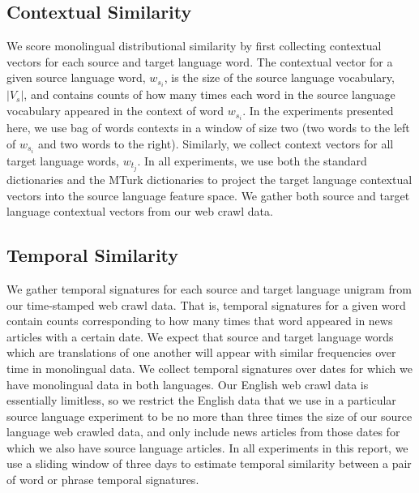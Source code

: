 \documentclass[11pt]{article}
\begin{document}
\subsection{Contextual Similarity} 
We score monolingual distributional similarity by first collecting contextual vectors for each source and target language word. The contextual vector for a given source language word, $w_{s_i}$, is the size of the source language vocabulary, $|V_s|$, and contains counts of how many times each word in the source language vocabulary appeared in the context of word $w_{s_i}$. In the experiments presented here, we use bag of words contexts in a window of size two (two words to the left of $w_{s_i}$ and two words to the right). Similarly, we collect context vectors for all target language words, $w_{t_j}$. In all experiments, we use both the standard dictionaries and the MTurk dictionaries to project the target language contextual vectors into the source language feature space.%
We gather both source and target language contextual vectors from our web crawl data.

\subsection{Temporal Similarity}\label{ssec:temporal}
We gather temporal signatures for each source and target language unigram from our time-stamped web crawl data. That is, temporal signatures for a given word contain counts corresponding to how many times that word appeared in news articles with a certain date. We expect that source and target language words which are translations of one another will appear with similar frequencies over time in monolingual data. We collect temporal signatures over dates for which we have monolingual data in both languages. Our English web crawl data is essentially limitless, so we restrict the English data that we use in a particular source language experiment to be no more than three times the size of our source language web crawled data, and only include news articles from those dates for which we also have source language articles. In all experiments in this report, we use a sliding window of three days to estimate temporal similarity between a pair of word or phrase temporal signatures.
\end{document}
